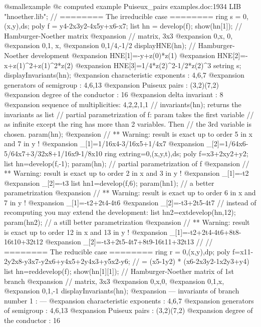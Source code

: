 @smallexample
@c computed example Puiseux_pairs examples.doc:1934 
  LIB "hnoether.lib";
  // ======== The irreducible case ========
  ring s = 0,(x,y),ds;
  poly f = y4-2x3y2-4x5y+x6-x7;
  list hn = develop(f);
  show(hn[1]);     // Hamburger-Noether matrix
@expansion{} // matrix, 3x3
@expansion{} 0,x,  0,  
@expansion{} 0,1,  x,  
@expansion{} 0,1/4,-1/2
  displayHNE(hn);  // Hamburger-Noether development
@expansion{} HNE[1]=-y+z(0)*z(1)
@expansion{} HNE[2]=-x+z(1)^2+z(1)^2*z(2)
@expansion{} HNE[3]=1/4*z(2)^2-1/2*z(2)^3
  setring s;
  displayInvariants(hn);
@expansion{}  characteristic exponents  : 4,6,7
@expansion{}  generators of semigroup   : 4,6,13
@expansion{}  Puiseux pairs             : (3,2)(7,2)
@expansion{}  degree of the conductor   : 16
@expansion{}  delta invariant           : 8
@expansion{}  sequence of multiplicities: 4,2,2,1,1
  // invariants(hn);  returns the invariants as list
  // partial parametrization of f: param takes the first variable
  // as infinite except the ring has more than 2 variables. Then
  // the 3rd variable is chosen.
  param(hn);
@expansion{} // ** Warning: result is exact up to order 5 in x and 7 in y !
@expansion{} _[1]=1/16x4-3/16x5+1/4x7
@expansion{} _[2]=1/64x6-5/64x7+3/32x8+1/16x9-1/8x10
  ring extring=0,(x,y,t),ds;
  poly f=x3+2xy2+y2;
  list hn=develop(f,-1);
  param(hn);       // partial parametrization of f
@expansion{} // ** Warning: result is exact up to order 2 in x and 3 in y !
@expansion{} _[1]=-t2
@expansion{} _[2]=-t3
  list hn1=develop(f,6);
  param(hn1);     // a better parametrization
@expansion{} // ** Warning: result is exact up to order 6 in x and 7 in y !
@expansion{} _[1]=-t2+2t4-4t6
@expansion{} _[2]=-t3+2t5-4t7
  // instead of recomputing you may extend the development:
  list hn2=extdevelop(hn,12);
  param(hn2);     // a still better parametrization
@expansion{} // ** Warning: result is exact up to order 12 in x and 13 in y !
@expansion{} _[1]=-t2+2t4-4t6+8t8-16t10+32t12
@expansion{} _[2]=-t3+2t5-4t7+8t9-16t11+32t13
  //
  // ======== The reducible case ========
  ring r = 0,(x,y),dp;
  poly f=x11-2y2x8-y3x7-y2x6+y4x5+2y4x3+y5x2-y6;
  // = (x5-1y2) * (x6-2x3y2-1x2y3+y4)
  list hn=reddevelop(f);
  show(hn[1][1]);     // Hamburger-Noether matrix of 1st branch
@expansion{} // matrix, 3x3
@expansion{} 0,x,0,
@expansion{} 0,1,x,
@expansion{} 0,1,-1
  displayInvariants(hn);
@expansion{}  --- invariants of branch number 1 : ---
@expansion{}  characteristic exponents  : 4,6,7
@expansion{}  generators of semigroup   : 4,6,13
@expansion{}  Puiseux pairs             : (3,2)(7,2)
@expansion{}  degree of the conductor   : 16
